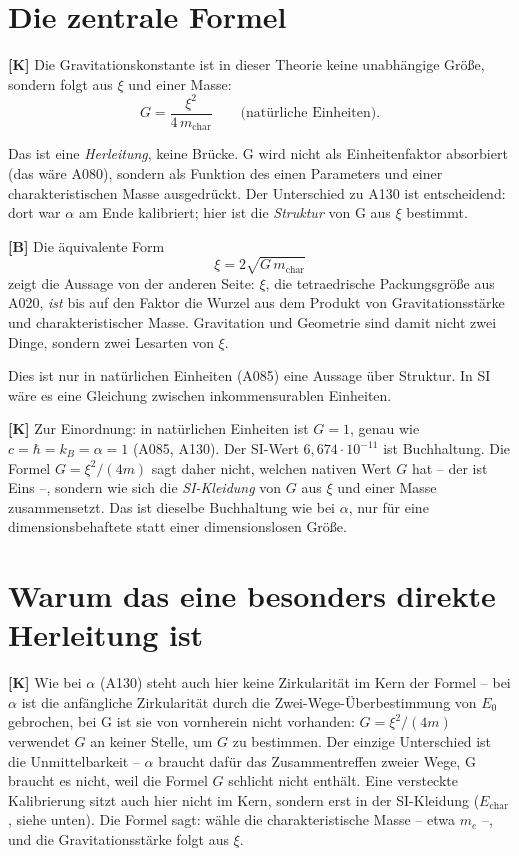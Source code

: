 \section{Die zentrale Formel}

\textbf{[K]} Die Gravitationskonstante ist in dieser Theorie keine unabhängige
Größe, sondern folgt aus $\xi$ und einer Masse:
\[
  G = \frac{\xi^2}{4\,m_\text{char}} \qquad\text{(natürliche Einheiten)}.
\]

Das ist eine \emph{Herleitung}, keine Brücke. G wird nicht als Einheitenfaktor
absorbiert (das wäre A080), sondern als Funktion des einen Parameters und einer
charakteristischen Masse ausgedrückt. Der Unterschied zu A130 ist
entscheidend: dort war $\alpha$ am Ende kalibriert; hier ist die
\emph{Struktur} von G aus $\xi$ bestimmt.

\textbf{[B]} Die äquivalente Form
\[
  \xi = 2\sqrt{G\,m_\text{char}}
\]
zeigt die Aussage von der anderen Seite: $\xi$, die tetraedrische
Packungsgröße aus A020, \emph{ist} bis auf den Faktor die Wurzel aus dem Produkt
von Gravitationsstärke und charakteristischer Masse. Gravitation und Geometrie
sind damit nicht zwei Dinge, sondern zwei Lesarten von $\xi$.

Dies ist nur in natürlichen Einheiten (A085) eine Aussage über Struktur. In SI
wäre es eine Gleichung zwischen inkommensurablen Einheiten.

\textbf{[K]} Zur Einordnung: in natürlichen Einheiten ist $G = 1$, genau wie
$c = \hbar = k_B = \alpha = 1$ (A085, A130). Der SI-Wert $6{,}674\cdot10^{-11}$
ist Buchhaltung. Die Formel $G = \xi^2/(4m)$ sagt daher nicht, welchen nativen
Wert $G$ hat -- der ist Eins --, sondern wie sich die \emph{SI-Kleidung} von $G$
aus $\xi$ und einer Masse zusammensetzt. Das ist dieselbe Buchhaltung wie bei
$\alpha$, nur für eine dimensionsbehaftete statt einer dimensionslosen Größe.

\section{Warum das eine besonders direkte Herleitung ist}

\textbf{[K]} Wie bei $\alpha$ (A130) steht auch hier keine Zirkularität im Kern
der Formel -- bei $\alpha$ ist die anfängliche Zirkularität durch die
Zwei-Wege-Überbestimmung von $E_0$ gebrochen, bei G ist sie von vornherein nicht
vorhanden: $G = \xi^2/(4m)$ verwendet $G$ an keiner Stelle, um $G$ zu bestimmen.
Der einzige Unterschied ist die Unmittelbarkeit -- $\alpha$ braucht dafür das
Zusammentreffen zweier Wege, G braucht es nicht, weil die Formel $G$ schlicht
nicht enthält. Eine versteckte Kalibrierung sitzt auch hier nicht im Kern,
sondern erst in der SI-Kleidung ($E_\text{char}$, siehe unten). Die Formel sagt:
wähle die charakteristische Masse -- etwa $m_e$ --, und die Gravitationsstärke
folgt aus $\xi$.

